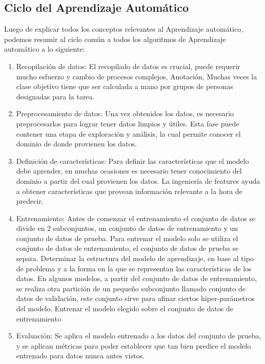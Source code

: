 \documentclass[a4paper,11pt,spanish]{book}
\begin{document}
    \subsection{Ciclo del Aprendizaje Automático}
      Luego de explicar todos los conceptos relevantes al Aprendizaje automático, podemos resumir al ciclo común a todos los algoritmos de Aprendizaje automático a lo siguiente:
      \begin{enumerate}
	\item Recopilación de datos:
	  El recopilado de datos es crucial, puede requerir mucho esfuerzo y cambio de procesos complejos,
	  Anotación, Muchas veces la clase objetivo tiene que ser calculada a mano por grupos de personas designadas para la tarea.
	\item Preprocesamiento de datos: Una vez obtenidos los datos, es necesario preprocesarlos para lograr tener datos limpios y útiles. Esta fase puede contener una etapa
	  de exploración y análisis, la cual permite conocer el dominio de donde provienen los datos.
	\item Definición de características: Para definir las características que el modelo debe aprender, en muchas ocasiones es necesario tener conocimiento del dominio a partir del cual provienen los datos.
	  La ingeniería de features ayuda a obtener características que provean información relevante a la hora de predecir.
	\item Entrenamiento:
	  \subitem Antes de comenzar el entrenamiento el conjunto de datos se divide en 2 subconjuntos, un conjunto de datos de entrenamiento y un conjunto de datos de prueba.
	  \subitem Para entrenar el modelo solo se utiliza el conjunto de datos de entrenamiento, el conjunto de datos de prueba se separa.
	  \subitem Determinar la estructura del modelo de aprendizaje, en base al tipo de problema y a la forma en la que se representan las características de los datos.
	  \subitem En algunos modelos, a partir del conjunto de datos de entrenamiento, se realiza otra partición de un pequeño subconjunto llamado conjunto de datos de validación, este conjunto sirve
	  para afinar ciertos hiper-parámetros del modelo.
	  \subitem Entrenar el modelo elegido sobre el conjunto de datos de entrenamiento
	\item Evaluación: Se aplica el modelo entrenado a los datos del conjunto de prueba, y se aplican métricas para poder establecer que tan bien predice el modelo entrenado para datos nunca antes vistos.
      \end{enumerate}
\end{document}
